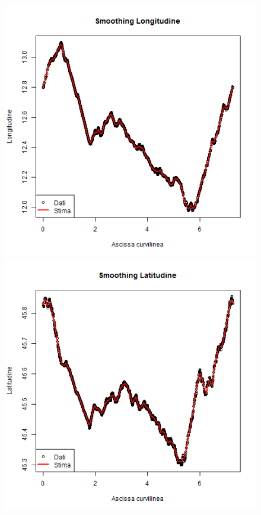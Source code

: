 \documentclass[a4paper,11pt,twoside,openright]{book}							%
\begin{document}
\begin{figure}[t]
	\centering
	\begin{minipage}{.32\textwidth}
	\includegraphics[width=\textwidth]{Immagini/Ven_Longitudine.png}
	\includegraphics[width=\textwidth]{Immagini/Ven_Latitudine.png}

\end{minipage}
\end{figure}
\end{document}
